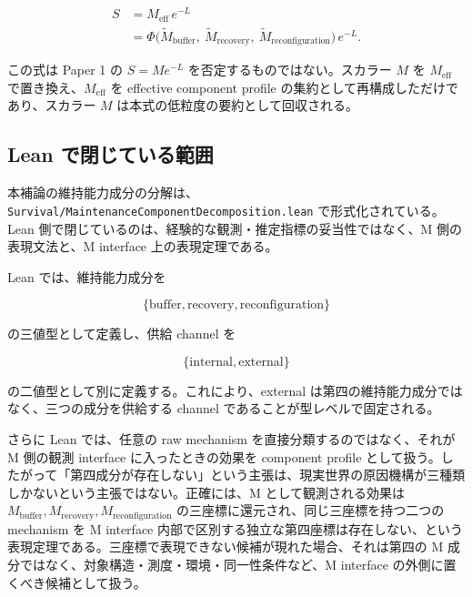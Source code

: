 \documentclass[12pt,a4paper]{article}
\begin{document}
\begin{definition}[本補論の最小形式]

$$
\begin{aligned}
S &= M_{\mathrm{eff}} \, e^{-L} \\
&= \Phi\bigl(\widetilde M_{\mathrm{buffer}},\ \widetilde M_{\mathrm{recovery}},\ \widetilde M_{\mathrm{reconfiguration}}\bigr) \, e^{-L}.
\end{aligned}
$$

\end{definition}

この式は Paper 1 の \(S = M e^{-L}\) を否定するものではない。スカラー \(M\) を \(M_{\mathrm{eff}}\) で置き換え、\(M_{\mathrm{eff}}\) を effective component profile の集約として再構成しただけであり、スカラー \(M\) は本式の低粒度の要約として回収される。

\subsection{Lean で閉じている範囲}\label{lean-ux3067ux9589ux3058ux3066ux3044ux308bux7bc4ux56f2}

本補論の維持能力成分の分解は、\texttt{Survival/MaintenanceComponentDecomposition.lean} で形式化されている。Lean 側で閉じているのは、経験的な観測・推定指標の妥当性ではなく、M 側の表現文法と、M interface 上の表現定理である。

Lean では、維持能力成分を

\[
\{\mathrm{buffer},\mathrm{recovery},\mathrm{reconfiguration}\}
\]

の三値型として定義し、供給 channel を

\[
\{\mathrm{internal},\mathrm{external}\}
\]

の二値型として別に定義する。これにより、external は第四の維持能力成分ではなく、三つの成分を供給する channel であることが型レベルで固定される。

さらに Lean では、任意の raw mechanism を直接分類するのではなく、それが M 側の観測 interface に入ったときの効果を component profile として扱う。したがって「第四成分が存在しない」という主張は、現実世界の原因機構が三種類しかないという主張ではない。正確には、M として観測される効果は \(M_{\mathrm{buffer}},M_{\mathrm{recovery}},M_{\mathrm{reconfiguration}}\) の三座標に還元され、同じ三座標を持つ二つの mechanism を M interface 内部で区別する独立な第四座標は存在しない、という表現定理である。三座標で表現できない候補が現れた場合、それは第四の M 成分ではなく、対象構造・測度・環境・同一性条件など、M interface の外側に置くべき候補として扱う。
\end{document}
